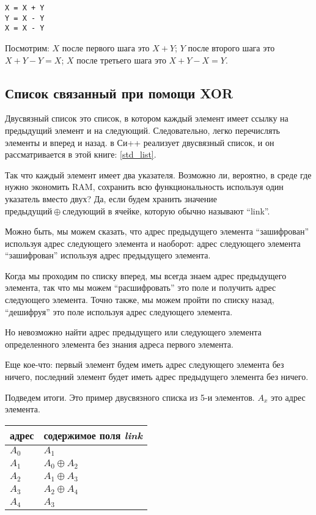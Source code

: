 \begin{lstlisting}
X = X + Y
Y = X - Y
X = X - Y
\end{lstlisting}

Посмотрим:
$X$ после первого шага это $X+Y$;
$Y$ после второго шага это $X+Y-Y=X$;
$X$ после третьего шага это $X+Y-X=Y$.

\subsection{Список связанный при помощи XOR}

Двусвязный список это список, в котором каждый элемент имеет ссылку на предыдущий элемент и на следующий.
Следовательно, легко перечислять элементы и вперед и назад.
 в Си++ реализует двусвязный список, и он рассматривается в этой книге: \ref{std_list}.

Так что каждый элемент имеет два указателя.
Возможно ли, вероятно, в среде где нужно экономить \ac{RAM}, сохранить всю функциональность используя один указатель
вместо двух?
Да, если будем хранить значение $предыдущий \oplus следующий$ в ячейке, которую обычно называют ``link''.

Можно быть, мы можем сказать, что адрес предыдущего элемента ``зашифрован'' используя адрес следующего элемента и наоборот:
адрес следующего элемента ``зашифрован'' используя адрес предыдущего элемента.

Когда мы проходим по списку вперед, мы всегда знаем адрес предыдущего элемента, так что мы можем ``расшифровать'' это поле
и получить адрес следующего элемента.
Точно также, мы можем пройти по списку назад, ``дешифруя'' это поле используя адрес следующего элемента.

Но невозможно найти адрес предыдущего или следующего элемента определенного элемента без знания адреса первого элемента.

Еще кое-что: первый элемент будем иметь адрес следующего элемента без ничего,
последний элемент будет иметь адрес предыдущего элемента без ничего.

Подведем итоги. Это пример двусвязного списка из 5-и элементов.
$A_x$ это адрес элемента.

\begin{center}
\begin{tabular}{ | l | l | }
	\hline
	\HeaderColor адрес & \HeaderColor содержимое поля \emph{link} \\
	\hline
	$A_0$ & $A_1$ \\
	\hline
	$A_1$ & $A_0 \oplus A_2$ \\
	\hline
	$A_2$ & $A_1 \oplus A_3$ \\
	\hline
	$A_3$ & $A_2 \oplus A_4$ \\
	\hline
	$A_4$ & $A_3$ \\
	\hline
\end{tabular}
\end{center}

